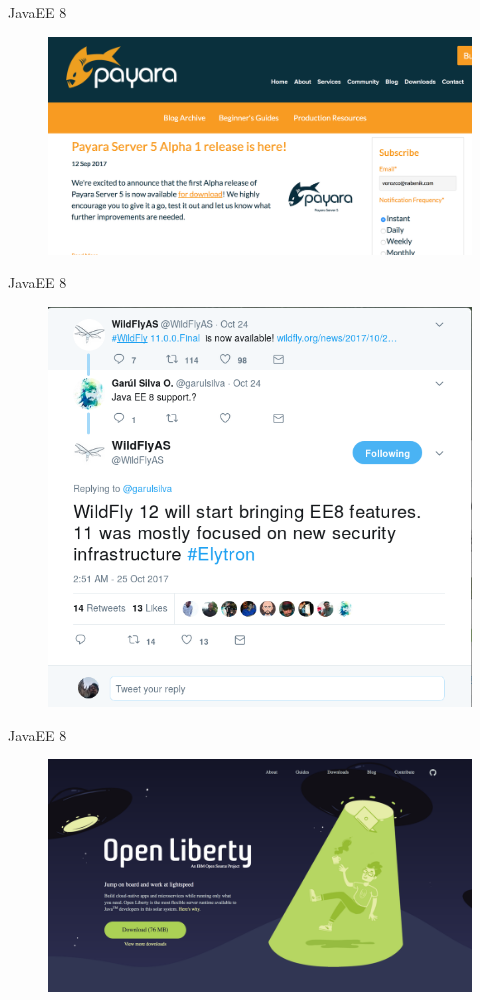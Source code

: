 \documentclass{beamer}
\begin{document}
\begin{frame}{JavaEE 8}
\begin{figure}
\centering
\includegraphics[width=\linewidth]{Images/payara5}
\end{figure}
\end{frame}

\begin{frame}{JavaEE 8}
\begin{figure}
\centering
\includegraphics[width=0.7\linewidth]{Images/wildflyee8}
\end{figure}
\end{frame}


\begin{frame}{JavaEE 8}
\begin{figure}
\centering
\includegraphics[width=\linewidth]{Images/liberty}
\end{figure}
\end{frame}
\end{document}

